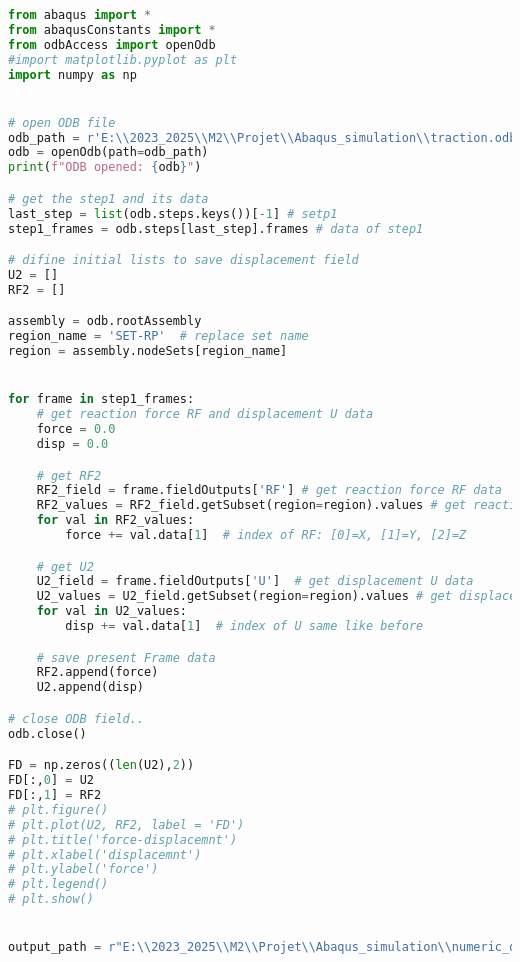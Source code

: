 \documentclass[12pt,a4paper]{article}
\begin{document}
\begin{lstlisting}[language=Python, caption={Extraction force-déplacement numérique }]
from abaqus import *
from abaqusConstants import *
from odbAccess import openOdb
#import matplotlib.pyplot as plt
import numpy as np


# open ODB file
odb_path = r'E:\\2023_2025\\M2\\Projet\\Abaqus_simulation\\traction.odb'
odb = openOdb(path=odb_path)
print(f"ODB opened: {odb}")

# get the step1 and its data
last_step = list(odb.steps.keys())[-1] # setp1
step1_frames = odb.steps[last_step].frames # data of step1

# difine initial lists to save displacement field
U2 = []
RF2 = []

assembly = odb.rootAssembly
region_name = 'SET-RP'  # replace set name
region = assembly.nodeSets[region_name]


for frame in step1_frames:
    # get reaction force RF and displacement U data
    force = 0.0
    disp = 0.0

    # get RF2
    RF2_field = frame.fieldOutputs['RF'] # get reaction force RF data
    RF2_values = RF2_field.getSubset(region=region).values # get reaction force RF values
    for val in RF2_values:
        force += val.data[1]  # index of RF: [0]=X, [1]=Y, [2]=Z

    # get U2
    U2_field = frame.fieldOutputs['U']  # get displacement U data
    U2_values = U2_field.getSubset(region=region).values # get displacement U values
    for val in U2_values:
        disp += val.data[1]  # index of U same like before

    # save present Frame data
    RF2.append(force)
    U2.append(disp)

# close ODB field..
odb.close()

FD = np.zeros((len(U2),2))
FD[:,0] = U2
FD[:,1] = RF2
# plt.figure()
# plt.plot(U2, RF2, label = 'FD')
# plt.title('force-displacemnt')
# plt.xlabel('displacemnt')
# plt.ylabel('force')
# plt.legend()
# plt.show()


output_path = r"E:\\2023_2025\\M2\\Projet\\Abaqus_simulation\\numeric_data\\force_displacement\\force_displacement.csv"


\end{lstlisting}
\end{document}
